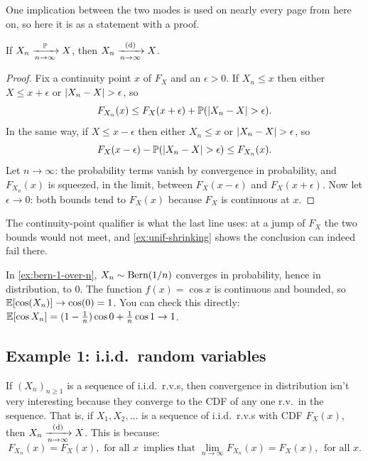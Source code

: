 One implication between the two modes is used on nearly every page from here on, so here it is as a statement with a proof.

\begin{proposition}
\label{prop:convp-implies-convd}
If $X_n \xrightarrow [n \to \infty ]{\mathbb{P}} X$, then $X_n \xrightarrow [n \to \infty ]{\text{(d)}} X$.
\end{proposition}

\begin{proof}
Fix a continuity point $x$ of $F_X$ and an $\epsilon > 0$.
If $X_n \leq x$ then either $X \leq x + \epsilon$ or $\lvert X_n - X\rvert > \epsilon$, so
\[
F_{X_n}(x) \leq F_X(x + \epsilon) + \mathbb{P}(\lvert X_n - X\rvert > \epsilon).
\]
In the same way, if $X \leq x - \epsilon$ then either $X_n \leq x$ or $\lvert X_n - X\rvert > \epsilon$, so
\[
F_X(x - \epsilon) - \mathbb{P}(\lvert X_n - X\rvert > \epsilon) \leq F_{X_n}(x).
\]
Let $n \to \infty$: the probability terms vanish by convergence in probability, and $F_{X_n}(x)$ is squeezed, in the limit, between $F_X(x - \epsilon)$ and $F_X(x + \epsilon)$.
Now let $\epsilon \to 0$: both bounds tend to $F_X(x)$ because $F_X$ is continuous at $x$.
\end{proof}

The continuity-point qualifier is what the last line uses: at a jump of $F_X$ the two bounds would not meet, and \cref{ex:unif-shrinking} shows the conclusion can indeed fail there.

\begin{example}
\label{ex:cos}
In \cref{ex:bern-1-over-n}, $X_n \sim \text{Bern}(1/n)$ converges in probability, hence in distribution, to $0$.
The function $f(x) = \cos x$ is continuous and bounded, so $\operatorname*{\mathbb{E}}[\cos(X_n)] \to \cos(0) = 1$.
You can check this directly: $\operatorname*{\mathbb{E}}[\cos X_n] = (1 - \frac1n) \cos 0 + \frac1n \cos 1 \to 1$.
\end{example}

\subsection{Example 1: i.i.d.\ random variables}

If $(X_n)_{n \geq 1}$ is a sequence of i.i.d.\ r.v.s, then convergence in distribution isn't very interesting because they converge to the CDF of any one r.v.\ in the sequence.
That is, if $X_1, X_2, \ldots$ is a sequence of i.i.d.\ r.v.s with CDF $F_X(x)$, then $X_n \xrightarrow [n \to \infty ]{\text{(d)}} X$.
This is because:
\[
F_{X_n}(x) = F_X(x), \text{ for all } x \, \text{ implies that } \lim_{n\to \infty} F_{X_n}(x) = F_X(x), \, \text{ for all } x.
\]


